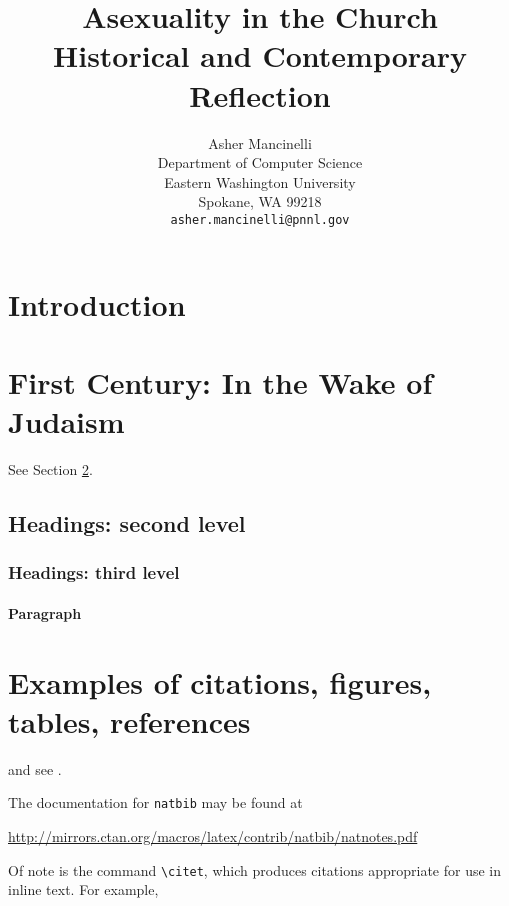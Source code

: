 \documentclass{article}
\title{
    Asexuality in the Church \\ 
    \large Historical and Contemporary Reflection}
\author{
  Asher Mancinelli \\
  Department of Computer Science\\
  Eastern Washington University\\
  Spokane, WA 99218 \\
  \texttt{asher.mancinelli@pnnl.gov} \\ }
\begin{document}
\maketitle

\begin{abstract}
\lipsum[1]
\end{abstract}


\section{Introduction}
\lipsum[2]
\lipsum[3]

\section{First Century: In the Wake of Judaism}
\label{sec:headings}

\lipsum[4] See Section \ref{sec:headings}.

\subsection{Headings: second level}

\subsubsection{Headings: third level}

\paragraph{Paragraph}
\lipsum[7]

\section{Examples of citations, figures, tables, references}
\label{sec:others}
\lipsum[8] \cite{kour2014real,kour2014fast} and see \cite{hadash2018estimate}.

The documentation for \verb+natbib+ may be found at

\begin{center}
  \url{http://mirrors.ctan.org/macros/latex/contrib/natbib/natnotes.pdf}
\end{center}

Of note is the command \verb+\citet+, which produces citations
appropriate for use in inline text.  For example,
\end{document}

